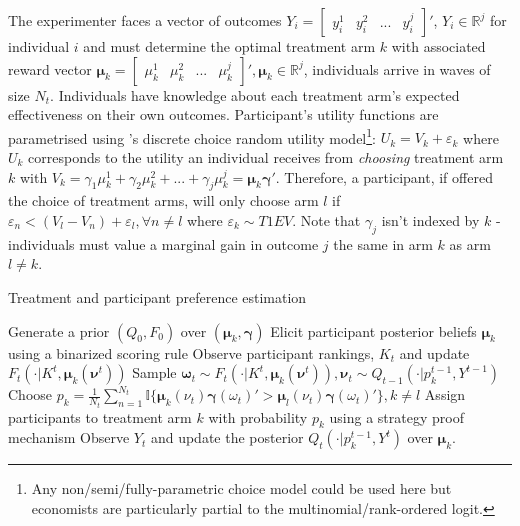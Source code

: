 \documentclass[twoside,11pt]{article}
\begin{document}
The experimenter faces a vector of outcomes $Y_{i} = \begin{bmatrix}
    y^1_{i} & y^2_{i} & ... & y^j_{i}
\end{bmatrix}'$, $Y_i \in \mathbb{R}^j$ for individual $i$ and must determine 
the optimal treatment 
arm $k$ with associated reward vector $\bm{\mu}_k = \begin{bmatrix}
    \mu^1_k & \mu^2_k & ... & \mu^j_k
\end{bmatrix}', \bm{\mu}_k \in \mathbb{R}^j$, individuals arrive in waves of size
$N_t$. Individuals have knowledge about each treatment arm's 
expected effectiveness on their own outcomes. Participant's
 utility functions are parametrised using \cite{mcfadden}'s discrete 
choice random utility model\footnote{Any non/semi/fully-parametric choice model could be used here 
but economists are particularly partial to the multinomial/rank-ordered logit.}: $U_k = V_k + \varepsilon_k$ 
where $U_k$  corresponds to the utility an individual receives from \emph{choosing} treatment arm $k$ 
with $V_k = \gamma_1 \mu_k^1 + \gamma_2 \mu_k^2 + ... + \gamma_j \mu_k^j = \bm{\mu}_k \bm{\gamma}'$. 
Therefore, a participant, if offered 
the choice of treatment arms, will only choose arm $l$ if $\varepsilon_n < (V_l - 
V_n) + \varepsilon_l, \forall n \neq l$ where $\varepsilon_k \sim T1EV$. Note that 
$\gamma_j$ isn't indexed by $k$ - individuals must value a marginal gain in 
outcome $j$ the same in arm $k$ as arm $l \neq k$.


\begin{algorithm}
  \caption{Treatment and participant preference estimation }\label{alg:cap}
  \begin{algorithmic}
  \State Generate a prior $(Q_0, F_0)$ over $\left(\bm{\mu}_k, \bm{\gamma}\right)$
  \State Elicit participant posterior beliefs $\bm{\mu}_k$ using a binarized scoring rule
  \State Observe participant rankings, $K_t$ and update $F_{t}( \cdot | K^{t}, \bm{\mu}_k(\bm{\nu}^{t}))$ 
  \State Sample $\bm{\omega}_{t} \sim F_{t}( \cdot | K^{t}, \bm{\mu}_k(\bm{\nu}^{t})), \bm{\nu}_t \sim Q_{t-1}(\cdot | p_{k}^{t-1}, Y^{t-1})$ 
  \State Choose $p_k = \frac{1}{N_t} 
  \sum^{N_t}_{n=1} \mathbb{I}\{\bm{\mu}_k(\nu_{t}) \bm{\gamma}(\omega_{t})' > \bm{\mu}_l(\nu_{t}) \bm{\gamma}(\omega_{t})'\}, k \neq l$ 
  \State Assign participants to treatment arm $k$ with probability $p_{k}$ using a strategy proof mechanism 
  \State Observe $Y_t$ and update the posterior $Q_{t}(\cdot | p_k^{t-1}, Y^{t})$ over $\bm{\mu}_k$. 
  \EndFor
  \end{algorithmic}
  \end{algorithm}
\end{document}
